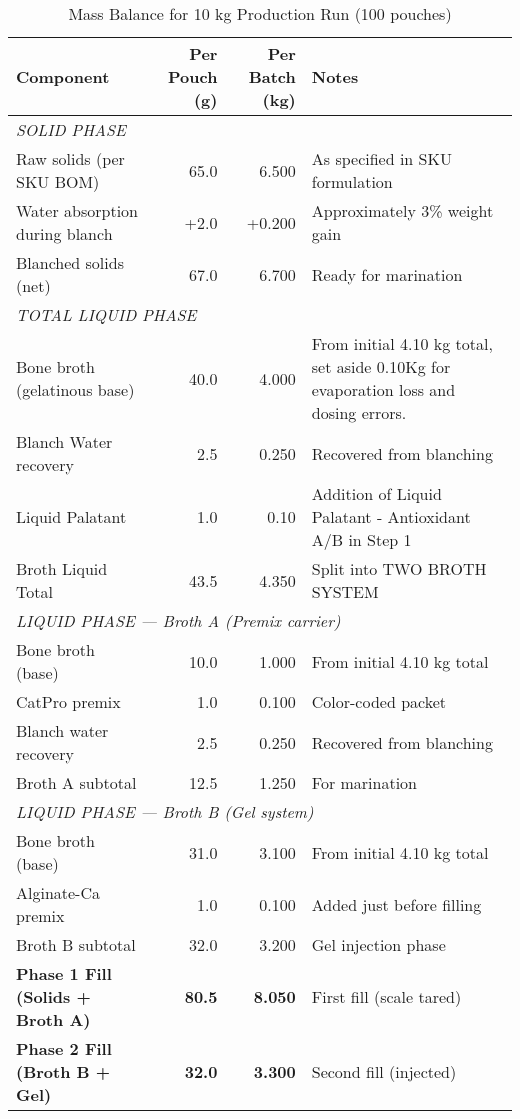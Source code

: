 \begin{table}[h]
\centering
\caption{Mass Balance for 10 kg Production Run (100 pouches)}
\label{tab:mass_balance}
\begin{tabular}{@{}lrrl@{}}
\toprule
\textbf{Component} & \textbf{Per Pouch (g)} & \textbf{Per Batch (kg)} & \textbf{Notes} \\
\midrule
\multicolumn{4}{l}{\textit{SOLID PHASE}} \\
Raw solids (per SKU BOM) & 65.0 & 6.500 & As specified in SKU formulation \\
Water absorption during blanch & +2.0 & +0.200 & Approximately 3\% weight gain \\
Blanched solids (net) & 67.0 & 6.700 & Ready for marination \\
\midrule
\multicolumn{4}{l}{\textit{TOTAL LIQUID PHASE}} \\
Bone broth (gelatinous base) & 40.0 & 4.000 & From initial 4.10 kg total, set aside 0.10Kg for evaporation loss and dosing errors.
\\
Blanch Water recovery & 2.5 & 0.250 & Recovered from blanching \\
Liquid Palatant & 1.0 & 0.10 & Addition of Liquid Palatant - Antioxidant A/B in  Step 1 \\
Broth Liquid Total  & 43.5 & 4.350 & Split into TWO BROTH SYSTEM \\
\midrule
\multicolumn{4}{l}{\textit{LIQUID PHASE --- Broth A (Premix carrier)}} \\
Bone broth (base) & 10.0 & 1.000 & From initial 4.10 kg total \\
CatPro premix & 1.0 & 0.100 & Color-coded packet \\
Blanch water recovery & 2.5 & 0.250 & Recovered from blanching \\
Broth A subtotal & 12.5 & 1.250 & For marination \\
\midrule
\multicolumn{4}{l}{\textit{LIQUID PHASE --- Broth B (Gel system)}} 
\\
Bone broth (base) & 31.0 & 3.100 & From initial 4.10 kg total \\
Alginate-Ca premix & 1.0 & 0.100 & Added just before filling \\
Broth B subtotal & 32.0 & 3.200 & Gel injection phase \\
\midrule
\textbf{Phase 1 Fill (Solids + Broth A)} & \textbf{80.5} & \textbf{8.050} & First fill (scale tared) \\
\textbf{Phase 2 Fill (Broth B + Gel)} & \textbf{32.0} & \textbf{3.300} & Second fill (injected) \\

\end{tabular}
\end{table}

